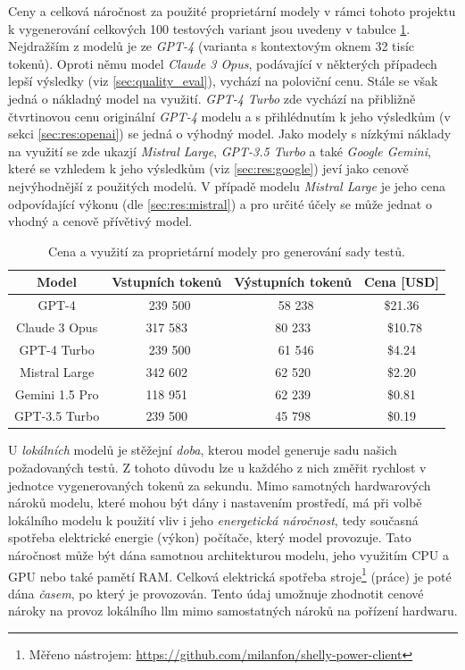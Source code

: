\documentclass[czech, ma, kiv, he, iso690numb, pdf, viewonly]{fasthesis}
\begin{document}
    Ceny a celková náročnost za použité proprietární modely v rámci tohoto projektu k vygenerování celkových 100 testových variant jsou uvedeny v tabulce \ref{tab:eval:price}. Nejdražším z modelů je ze \textit{GPT-4} (varianta s kontextovým oknem 32 tisíc tokenů). Oproti němu model \textit{Claude 3 Opus}, podávající v některých případech lepší výsledky (viz \ref{sec:quality_eval}), vychází na poloviční cenu. Stále se však jedná o nákladný model na využití. \textit{GPT-4 Turbo} zde vychází na přibližně čtvrtinovou cenu originální \textit{GPT-4} modelu a s přihlédnutím k jeho výsledkům (v sekci \ref{sec:res:openai}) se jedná o výhodný model. Jako modely s nízkými náklady na využití se zde ukazjí \textit{Mistral Large}, \textit{GPT-3.5 Turbo} a také \textit{Google Gemini}, které se vzhledem k jeho výsledkům (viz \ref{sec:res:google}) jeví jako cenově nejvýhodnější z použitých modelů. V případě modelu \textit{Mistral Large} je jeho cena odpovídající výkonu (dle \ref{sec:res:mistral}) a pro určité účely se může jednat o vhodný a cenově přívětivý model.

    \begin{table}[H]
        \begin{tabular}{|c|c|c|c|}
            \hline
            \textbf{Model} & \textbf{Vstupních tokenů} & \textbf{Výstupních tokenů} & \textbf{Cena} [USD] \\
            \hline
            GPT-4 & 239 500 & 58 238 & \$21.36 \\
            \hline
            Claude 3 Opus & 317 583 & 80 233 & \$10.78 \\
            \hline
            GPT-4 Turbo & 239 500 & 61 546 & \$4.24 \\
            \hline
            Mistral Large & 342 602 & 62 520 & \$2.20 \\
            \hline
            Gemini 1.5 Pro & 118 951 & 62 239 & \$0.81 \\
            \hline
            GPT-3.5 Turbo & 239 500 & 45 798 & \$0.19 \\
            \hline
        \end{tabular}
        \centering
        \caption{Cena a využití za proprietární modely pro generování sady testů.}
        \label{tab:eval:price}
    \end{table}

    U \textit{lokálních} modelů je stěžejní \textit{doba}, kterou model generuje sadu našich požadovaných testů. Z tohoto důvodu lze u každého z nich změřit rychlost v jednotce vygenerovaných tokenů za sekundu. Mimo samotných hardwarových nároků modelu, které mohou být dány i nastavením prostředí, má při volbě lokálního modelu k použití vliv i jeho \textit{energetická náročnost}, tedy současná spotřeba elektrické energie (výkon) počítače, který model provozuje. Tato náročnost může být dána samotnou architekturou modelu, jeho využitím CPU a GPU nebo také pamětí RAM. \cite{zhang2023hardware} Celková elektrická spotřeba stroje\footnote{Měřeno nástrojem: \url{https://github.com/milanfon/shelly-power-client}} (práce) je poté dána \textit{časem}, po který je provozován. Tento údaj umožnuje zhodnotit cenové nároky na provoz lokálního \Gls{llm} mimo samostatných nároků na pořízení hardwaru.
\end{document}
